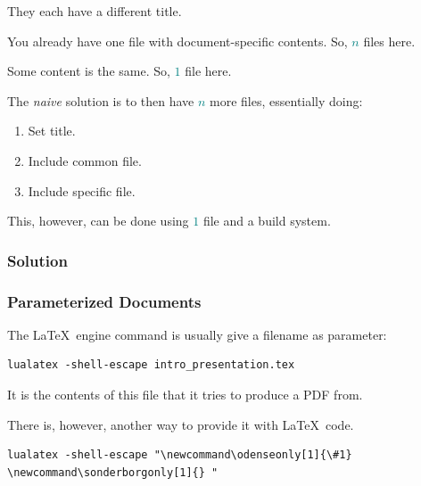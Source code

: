 {\begin{frame}[fragile]
  \vspace{5mm}
  They each have a different title.
  
  \vspace{5mm}
  You already have one file with document-specific contents. So, \textcolor{teal}{$n$} files here.
  
  \vspace{5mm}
  Some content is the same. So, \textcolor{teal}{$1$} file here.
  
  \vspace{5mm}
  The \textsl{naive} solution is to then have \textcolor{teal}{$n$} more files, essentially doing:
  \begin{enumerate}
    \item Set title.
    \item Include common file.
    \item Include specific file.
  \end{enumerate}
  
  \vspace{3mm}
  This, however, can be done using \textcolor{teal}{$1$} file and a build system.
\end{frame}

\subsubsection{Solution}
\begin{frame}[fragile]
  \frametitle{Parameterized Documents }
  \vspace{3mm}
  The \LaTeX\ engine command is usually give a filename as parameter:
  
  \vspace{1mm}
  \begin{verbatim}
lualatex -shell-escape intro_presentation.tex
  \end{verbatim}
  
  \vspace{5mm}
  It is the contents of this file that it tries to produce a PDF from.
  
  \pause
  \vspace{5mm}
  There is, however, another way to provide it with \LaTeX\ code.
  
  \vspace{1mm}
  \begin{verbatim}
lualatex -shell-escape "\newcommand\odenseonly[1]{\#1} \newcommand\sonderborgonly[1]{} "
  \end{verbatim}
  

\end{frame}}
